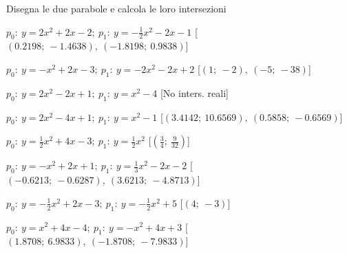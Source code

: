 \begin{esercizio}\label{ese:}
 Disegna le due parabole e calcola le loro intersezioni
 \begin{enumeratea}
  \item  \(p_0:~y=2 x^2 +2 x -2;~p_1:~y=-\frac{1}{2} x^2 -2 x -1\)
   \hfill [\(\left (0.2198;~-1.4638 \right ),~\left (-1.8198;~0.9838 \right )\)]
  \item  \(p_0:~y=- x^2 +2 x -3;~p_1:~y=-2 x^2 -2 x +2\)
   \hfill [\(\left (1;~-2 \right ),~\left (-5;~-38 \right )\)]
  \item  \(p_0:~y=2 x^2 -2 x +1;~p_1:~y=x^2 -4\)
   \hfill [No inters. reali]
  \item  \(p_0:~y=2 x^2 -4 x +1;~p_1:~y=x^2 -1\)
   \hfill [\(\left (3.4142;~10.6569 \right ),~\left (0.5858;~-0.6569 \right )\)]
  \item  \(p_0:~y=\frac{1}{2} x^2 +4 x -3;~p_1:~y=\frac{1}{2} x^2 \)
   \hfill [\(\left (\frac{3}{4};~\frac{9}{32} \right )\)]
  \item  \(p_0:~y=- x^2 +2 x +1;~p_1:~y=\frac{1}{3} x^2 -2 x -2\)
   \hfill [\(\left (-0.6213;~-0.6287 \right ),~\left (3.6213;~-4.8713 \right )\)]
  \item  \(p_0:~y=-\frac{1}{2} x^2 +2 x -3;~p_1:~y=-\frac{1}{2} x^2 +5\)
   \hfill [\(\left (4;~-3 \right )\)]
  \item  \(p_0:~y=x^2 +4 x -4;~p_1:~y=- x^2 +4 x +3\)
   \hfill [\(\left (1.8708;~6.9833 \right ),~\left (-1.8708;~-7.9833 \right )\)]

\end{enumeratea}
\end{esercizio}
